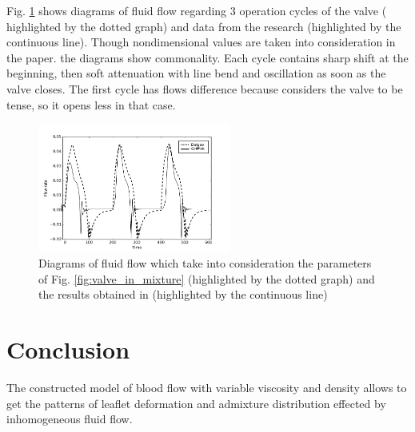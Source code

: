 \documentclass[conference]{IEEEtran}
\begin{document}
Fig. \ref{fig:flow_rate} shows diagrams of fluid flow regarding 3 operation cycles of the valve ( 
highlighted by the dotted graph) and data from the research \cite{griffith} (highlighted by 
the continuous line).  Though nondimensional values are taken into 
consideration in the paper. the diagrams show commonality. Each cycle contains 
sharp shift at the beginning, then soft attenuation with line bend and 
oscillation as soon as the valve closes. The first cycle has flows difference 
because \cite{griffith} considers the valve to be tense, so it opens less in that case.

\begin{figure}[!t]
\centering
\includegraphics[width=2.5in]{images/flow_rate_comparison_with_legend_grayscale.png}
\caption{Diagrams of fluid flow which take into consideration the parameters of Fig. \ref{fig:valve_in_mixture} (highlighted by the dotted
    graph)  and the results obtained in \cite{griffith} (highlighted by the continuous line)}
\label{fig:flow_rate}
\end{figure}

\section{Conclusion}

The constructed model of blood flow with variable viscosity and density allows 
to get the patterns of leaflet deformation and admixture distribution effected by 
inhomogeneous fluid flow.

%
%
\end{document}
